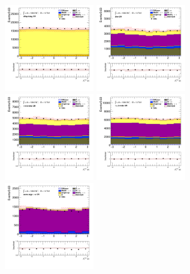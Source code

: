 		\begin{figure}[!htp]
			\begin{center}    
			\includegraphics[width=0.35\textwidth]{chapters/chapter6_HPlus/images/taulep/met_phi_DILEP_BTAG.png}
			\includegraphics[width=0.35\textwidth]{chapters/chapter6_HPlus/images/taulep/met_phi_ZEE.png} \\
			\includegraphics[width=0.35\textwidth]{chapters/chapter6_HPlus/images/taulep/met_phi_TAUEL_BVETO.png} 
			\includegraphics[width=0.35\textwidth]{chapters/chapter6_HPlus/images/taulep/met_phi_TAUMU_BVETO.png} \\
			\includegraphics[width=0.35\textwidth]{chapters/chapter6_HPlus/images/taulep/met_phi_SS_TAUEL.png} 

\end{center}
\end{figure}
